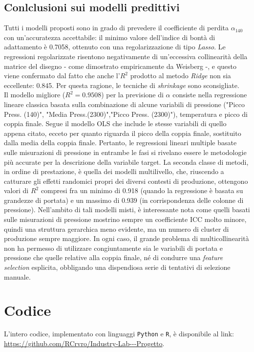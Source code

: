 \documentclass[fleqn,10pt]{SelfArx} %
\begin{document}
\subsection{Conlclusioni sui modelli predittivi}
Tutti i modelli proposti sono in grado di prevedere il coefficiente di perdita $\alpha_{140}$ con un'accuratezza accettabile: il minimo valore dell'indice di bontà di adattamento è 0.7058, ottenuto con una regolarizzazione di tipo \textit{Lasso}. Le regressioni regolarizzate risentono negativamente di un'eccessiva collinearità della matrice del disegno - come dimostrato empiricamente da Weisberg \cite{Wei}\cite{Wei1} -, e questo viene confermato dal fatto che anche l'$R^2$ prodotto al metodo \textit{Ridge} non sia eccellente: 0.845. Per questa ragione, le tecniche di \textit{shrinkage} sono sconsigliate.\\
Il modello migliore ($R^2=0.9508$) per la previsione di $\alpha$ consiste nella regressione lineare classica basata sulla combinazione di alcune variabili di pressione ("Picco Press. (140)", "Media Press.(2300)","Picco Press. (2300)"), temperatura e picco di coppia finale. Segue il modello OLS che include le stesse variabili di quello appena citato, ecceto per quanto riguarda il picco della coppia finale, sostituito dalla media della coppia finale. Pertanto, le regressioni lineari multiple basate sulle misurazioni di pressione in entrambe le fasi si rivelano essere le metodologie più accurate per la descrizione della variabile target. La seconda classe di metodi, in ordine di prestazione, è quella dei modelli multilivello, che, riuscendo a catturare gli effetti randomici propri dei diversi contesti di produzione, ottengono valori di $R^2$ compresi fra un minimo di 0.918 (quando la regressione è basata su grandezze di portata) e un massimo di 0.939 (in corrispondenza delle colonne di pressione). Nell'ambito di tali modelli misti, è interessante nota come quelli basati sulle misurazioni di pressione mostrino sempre un coefficiente ICC molto minore, quindi una struttura gerarchica meno evidente, ma un numero di cluster di produzione sempre maggiore.
In ogni caso, il grande problema di multicollinearità non ha permesso di utilizzare congiuntamente sia le variabili di portata e pressione che quelle relative alla coppia finale, né di condurre una \textit{feature selection} esplicita, obbligando una dispendiosa serie di tentativi di selezione manuale. 
\section*{Codice}
L'intero codice, implementato con linguaggi \texttt{Python} e \texttt{R}, è disponibile al link: \url{https://github.com/RCrvro/Industry-Lab---Progetto}.
\end{document}
